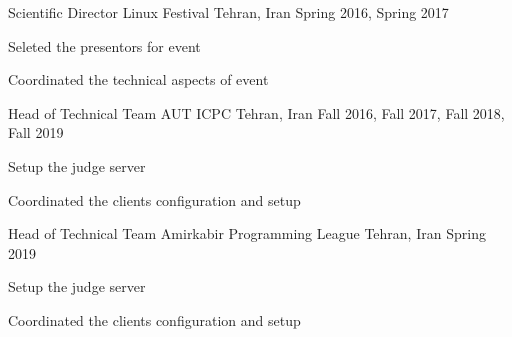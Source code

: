 

\begin{cventries}

  \cventry%
    {Scientific Director} %
    {Linux Festival} %
    {Tehran, Iran} %
    {Spring 2016, Spring 2017} %
    {%
      \begin{cvitems} %
        \item {Seleted the presentors for event}
        \item {Coordinated the technical aspects of event}
      \end{cvitems}
    }


  \cventry%
    {Head of Technical Team} %
    {AUT ICPC} %
    {Tehran, Iran} %
    {Fall 2016, Fall 2017, Fall 2018, Fall 2019} %
    {%
      \begin{cvitems} %
        \item {Setup the judge server}
        \item {Coordinated the clients configuration and setup}
      \end{cvitems}
    }



  \cventry%
    {Head of Technical Team} %
    {Amirkabir Programming League} %
    {Tehran, Iran} %
    {Spring 2019} %
    {%
      \begin{cvitems} %
        \item {Setup the judge server}
        \item {Coordinated the clients configuration and setup}
      \end{cvitems}
    }

\end{cventries}
